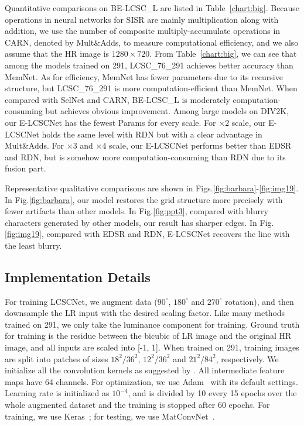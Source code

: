 \documentclass[journal]{IEEEtran}
\begin{document}
Quantitative comparisons on BE-LCSC\_L are listed in Table~\ref{chart:big}. Because operations in neural networks for SISR are mainly multiplication along with addition, we use the number of composite multiply-accumulate operations in CARN, denoted by Mult\&Adds, to measure computational efficiency, and we also assume that the HR image is $1280\times720$. From Table~\ref{chart:big}, we can see that among the models trained on 291, LCSC\_76\_291 achieves better accuracy than MemNet. As for efficiency, MemNet has fewer parameters due to its recursive structure, but LCSC\_76\_291 is more computation-efficient than MemNet. When compared with SelNet and CARN, BE-LCSC\_L is moderately computation-consuming but achieves obvious improvement. Among large models on DIV2K, our E-LCSCNet has the fewest Params for every scale. For $\times 2$ scale, our E-LCSCNet holds the same level with RDN but with a clear advantage in Mult\&Adds. For $\times 3$ and $\times 4$ scale, our E-LCSCNet performs better than EDSR and RDN, but is somehow more computation-consuming than RDN due to its fusion part. 

Representative qualitative comparisons are shown in Figs.\ref{fig:barbara}-\ref{fig:img19}. In Fig.\ref{fig:barbara}, our model restores the grid structure more precisely with fewer artifacts than other models. In Fig.\ref{fig:ppt3}, compared with blurry characters generated by other models, our result has sharper edges. In Fig.\ref{fig:img19}, compared with EDSR and RDN, E-LCSCNet recovers the line with the least blurry.   

\subsection{Implementation Details}
For training LCSCNet, we augment data ($90^{\circ}$, $180^{\circ}$ and $270^{\circ}$ rotation), and then downsample the LR input with the desired scaling factor. Like many methods trained on 291, we only take the luminance component for training. Ground truth for training is the residue between the bicubic of LR image and the original HR image, and all inputs are scaled into [-1, 1]. When trained on 291, training images are split into patches of sizes $18^2/36^2$, $12^2/36^2$ and $21^2/84^2$, respectively. We initialize all the convolution kernels as suggested by \cite{he2015delving}. All intermediate feature maps have 64 channels. For optimization, we use Adam~\cite{kingma2014adam} with its default settings. Learning rate is initialized as $10^{-4}$, and is divided by 10 every 15 epochs over the whole augmented dataset and the training is stopped after 60 epochs. For training, we use Keras~\cite{chollet2015keras}; for testing, we use MatConvNet~\cite{vedaldi2015matconvnet}. 
\end{document}

